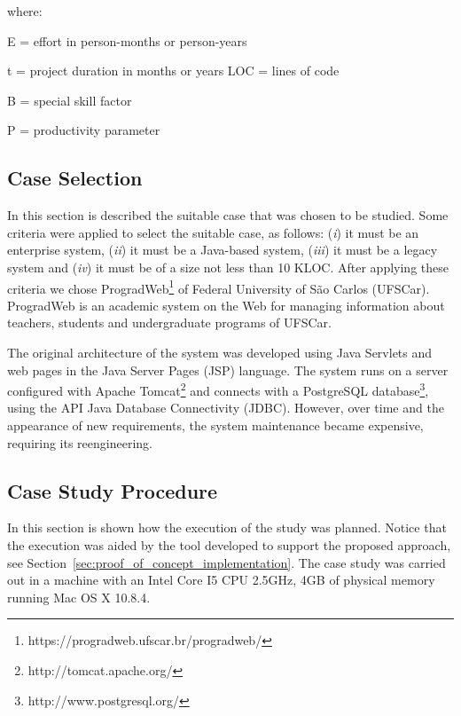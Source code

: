 \documentclass[a4paper,twoside]{article}
\begin{document}
where:

E = effort in person-months or person-years 

t = project duration in months or years LOC = lines of code

B = special skill factor

P = productivity parameter


\subsection{Case Selection} %
\label{sub:case_selection}

In this section is described the suitable case that was chosen to be studied. Some criteria were applied to select the suitable case, as follows: (\textit{i}) it must be an enterprise system, (\textit{ii}) it must be a Java-based system, (\textit{iii}) it must be a legacy system and (\textit{iv}) it must be of a size not less than 10 KLOC. After applying these criteria we chose ProgradWeb\footnote{https://progradweb.ufscar.br/progradweb/} of Federal University of S\~ao Carlos (UFSCar). ProgradWeb is an academic system on the Web for managing information about teachers, students and undergraduate programs of UFSCar. 

The original architecture of the system was developed using Java Servlets and web pages in the Java Server Pages (JSP) language. The system runs on a server configured with Apache Tomcat\footnote{http://tomcat.apache.org/} and connects with a PostgreSQL database\footnote{http://www.postgresql.org/}, using the API Java Database Connectivity (JDBC). However, over time and the appearance of new requirements, the system maintenance became expensive, requiring its reengineering.

\subsection{Case Study Procedure} %
\label{sub:case_study_procedure}

In this section is shown how the execution of the study was planned. Notice that the execution was aided by the tool developed to support the proposed approach, see Section~\ref{sec:proof_of_concept_implementation}. The case study was carried out in a machine with an Intel Core I5 CPU 2.5GHz, 4GB of physical memory running Mac OS X 10.8.4. 
\end{document}
